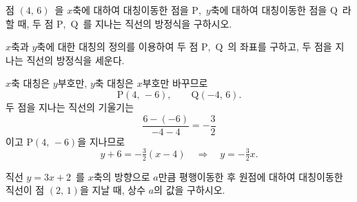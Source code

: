 \documentclass[10pt]{article}
\begin{document}
\newpage


\begin{dmproblem}
점 $(4,\, 6)$\ 을 $x$축에 대하여 대칭이동한 점을 $\mathrm{P}$,\ $y$축에 대하여 대칭이동한 점을 $\mathrm{Q}$\ 라 할 때, 두 점 $\mathrm{P}$,\ $\mathrm{Q}$\ 를 지나는 직선의 방정식을 구하시오.
\end{dmproblem}

\begin{dmapproach}
$x$축과 $y$축에 대한 대칭의 정의를 이용하여 두 점 $\mathrm{P}$,\ $\mathrm{Q}$\ 의 좌표를 구하고, 두 점을 지나는 직선의 방정식을 세운다.
\end{dmapproach}

\begin{dmsolution}
$x$축 대칭은 $y$부호만, $y$축 대칭은 $x$부호만 바꾸므로
\begin{equation*}
  \mathrm{P}(4,\, -6),\qquad \mathrm{Q}(-4,\, 6).
\end{equation*}
두 점을 지나는 직선의 기울기는
\[ \dfrac{6 - (-6)}{-4 - 4} = -\dfrac{3}{2} \]
이고 $\mathrm{P}(4,\, -6)$을 지나므로
\begin{equation*}
  y + 6 = -\tfrac{3}{2}(x - 4) \quad\Longrightarrow\quad y = -\tfrac{3}{2}x.
\end{equation*}
\end{dmsolution}

\dmchecktitle



\newpage


\begin{dmproblem}
직선 $y = 3x + 2$\ 를 $x$축의 방향으로 $a$만큼 평행이동한 후 원점에 대하여 대칭이동한 직선이 점 $(2,\, 1)$을 지날 때, 상수 $a$의 값을 구하시오.
\end{dmproblem}
\end{document}
